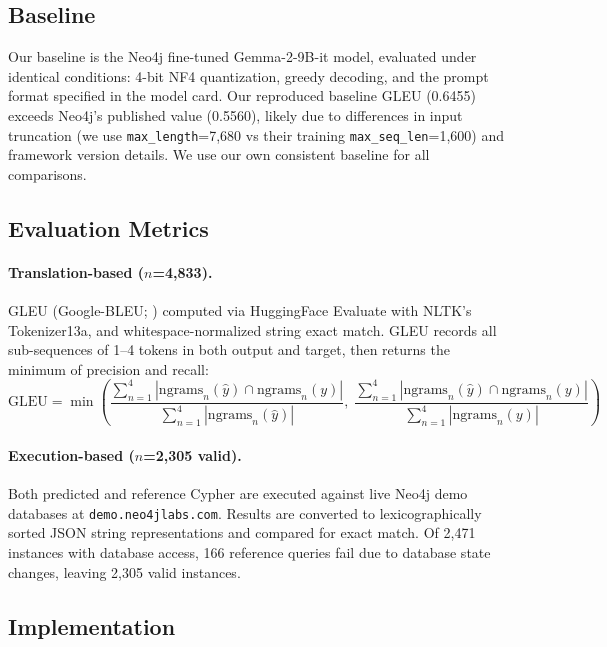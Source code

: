 \documentclass[11pt]{article}
\begin{document}
\subsection{Baseline}

Our baseline is the Neo4j fine-tuned Gemma-2-9B-it model, evaluated under identical conditions: 4-bit NF4 quantization, greedy decoding, and the prompt format specified in the model card. Our reproduced baseline GLEU (0.6455) exceeds Neo4j's published value (0.5560), likely due to differences in input truncation (we use \texttt{max\_length}=7,680 vs their training \texttt{max\_seq\_len}=1,600) and framework version details. We use our own consistent baseline for all comparisons.

\subsection{Evaluation Metrics}

\paragraph{Translation-based ($n$=4,833).} GLEU (Google-BLEU; \citealt{wu2016gnmt}) computed via HuggingFace Evaluate with NLTK's Tokenizer13a, and whitespace-normalized string exact match. GLEU records all sub-sequences of 1--4 tokens in both output and target, then returns the minimum of precision and recall:
\begin{equation}
    \text{GLEU} = \min\!\left(\frac{\sum_{n=1}^{4} |\text{ngrams}_n(\hat{y}) \cap \text{ngrams}_n(y)|}{\sum_{n=1}^{4} |\text{ngrams}_n(\hat{y})|},\; \frac{\sum_{n=1}^{4} |\text{ngrams}_n(\hat{y}) \cap \text{ngrams}_n(y)|}{\sum_{n=1}^{4} |\text{ngrams}_n(y)|}\right)
\end{equation}

\paragraph{Execution-based ($n$=2,305 valid).} Both predicted and reference Cypher are executed against live Neo4j demo databases at \texttt{demo.neo4jlabs.com}. Results are converted to lexicographically sorted JSON string representations and compared for exact match. Of 2,471 instances with database access, 166 reference queries fail due to database state changes, leaving 2,305 valid instances.

\subsection{Implementation}
\end{document}
